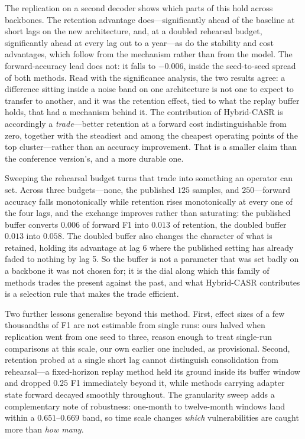 The replication on a second decoder shows which parts of this hold across backbones. The retention advantage does---significantly ahead of the baseline at short lags on the new architecture, and, at a doubled rehearsal budget, significantly ahead at every lag out to a year---as do the stability and cost advantages, which follow from the mechanism rather than from the model. The forward-accuracy lead does not: it falls to $-0.006$, inside the seed-to-seed spread of both methods. Read with the significance analysis, the two results agree: a difference sitting inside a noise band on one architecture is not one to expect to transfer to another, and it was the retention effect, tied to what the replay buffer holds, that had a mechanism behind it. The contribution of Hybrid-CASR is accordingly a \emph{trade}---better retention at a forward cost indistinguishable from zero, together with the steadiest and among the cheapest operating points of the top cluster---rather than an accuracy improvement. That is a smaller claim than the conference version's, and a more durable one.

Sweeping the rehearsal budget turns that trade into something an operator can set. Across three budgets---none, the published $125$ samples, and $250$---forward accuracy falls monotonically while retention rises monotonically at every one of the four lags, and the exchange improves rather than saturating: the published buffer converts $0.006$ of forward F1 into $0.013$ of retention, the doubled buffer $0.013$ into $0.058$. The doubled buffer also changes the character of what is retained, holding its advantage at lag 6 where the published setting has already faded to nothing by lag 5. So the buffer is not a parameter that was set badly on a backbone it was not chosen for; it is the dial along which this family of methods trades the present against the past, and what Hybrid-CASR contributes is a selection rule that makes the trade efficient.

Two further lessons generalise beyond this method. First, effect sizes of a few thousandths of F1 are not estimable from single runs: ours halved when replication went from one seed to three, reason enough to treat single-run comparisons at this scale, our own earlier one included, as provisional. Second, retention probed at a single short lag cannot distinguish consolidation from rehearsal---a fixed-horizon replay method held its ground inside its buffer window and dropped $0.25$ F1 immediately beyond it, while methods carrying adapter state forward decayed smoothly throughout. The granularity sweep adds a complementary note of robustness: one-month to twelve-month windows land within a $0.651$--$0.669$ band, so time scale changes \emph{which} vulnerabilities are caught more than \emph{how many}.

